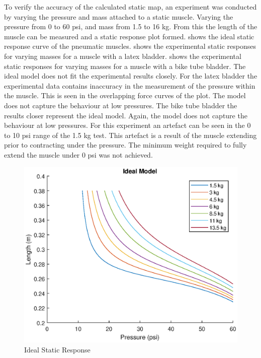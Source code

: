 \documentclass[11pt,a4paper]{article}
\begin{document}
To verify the accuracy of the calculated static map, an experiment was conducted by varying the pressure and mass attached to a static muscle. Varying the pressure from 0 to 60 psi, and mass from 1.5 to 16 kg. From this the length of the muscle can be measured and a static response plot formed.  shows the ideal static response curve of the pneumatic muscles.
 shows the experimental static responses for varying masses for a muscle with a latex bladder.  shows the experimental static responses for varying masses for a muscle with a bike tube bladder. \newline 
The ideal model does not fit the experimental results closely. For the latex bladder the experimental data contains inaccuracy in the measurement of the pressure within the muscle. This is seen in the overlapping force curves of the plot. The model does not capture the behaviour at low pressures. The bike tube bladder the results closer represent the ideal model. Again, the model does not capture the behaviour at low pressures. For this experiment an artefact can be seen in the 0 to 10 psi range of the 1.5 kg test. This artefact is a result of the muscle extending prior to contracting under the pressure. The minimum weight required to fully extend the muscle under 0 psi was not achieved.

\begin{figure}[!hbt]
    \centering
    \includegraphics[scale=0.8]{IdealModel.eps}
    \caption{Ideal Static Response}
    \label{fig:static_response_ideal}
\end{figure}
\end{document}
